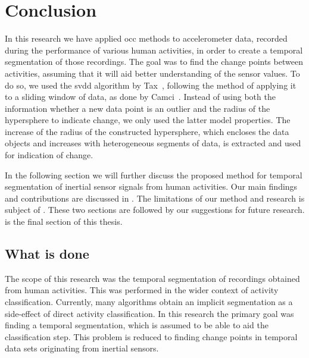 
\chapter{Conclusion}

\label{Chapter7} %


In this research we have applied \gls{occ} methods to accelerometer data, recorded during the performance of various human activities, in order to create a temporal segmentation of those recordings.
The goal was to find the change points between activities, assuming that it will aid better understanding of the sensor values.
To do so, we used the \gls{svdd} algorithm by Tax~\cite{tax1999support}, following the method of applying it to a sliding window of data, as done by Camci~\cite{camci2010change}.
Instead of using both the information whether a new data point is an outlier and the radius of the hypersphere to indicate change, we only used the latter model properties.
The increase of the radius of the constructed hypersphere, which encloses the data objects and increases with heterogeneous segments of data, is extracted and used for indication of change.

In the following section we will further discuss the proposed method for temporal segmentation of inertial sensor signals from human activities.
Our main findings and contributions are discussed in .
The limitations of our method and research is subject of .
These two sections are followed by our suggestions for future research.
 is the final section of this thesis.

\section{What is done}
The scope of this research was the temporal segmentation of recordings obtained from human activities.
This was performed in the wider context of activity classification.
Currently, many algorithms obtain an implicit segmentation as a side-effect of direct activity classification.
In this research the primary goal was finding a temporal segmentation, which is assumed to be able to aid the classification step.
This problem is reduced to finding change points in temporal data sets originating from inertial sensors.


